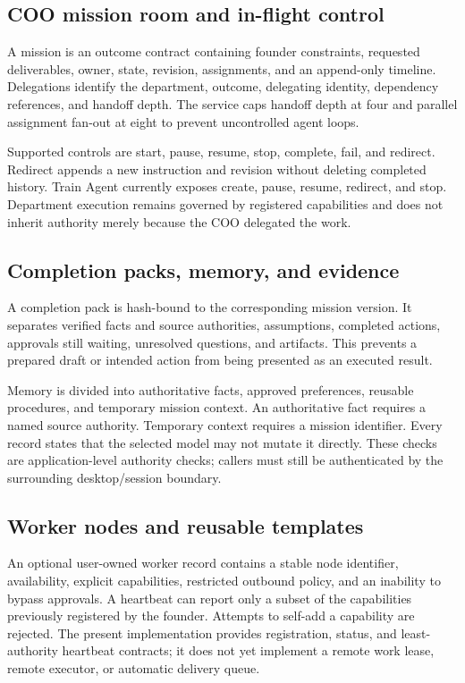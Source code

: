 \subsection{COO mission room and in-flight control}

A mission is an outcome contract containing founder constraints, requested
deliverables, owner, state, revision, assignments, and an append-only timeline.
Delegations identify the department, outcome, delegating identity, dependency
references, and handoff depth.  The service caps handoff depth at four and
parallel assignment fan-out at eight to prevent uncontrolled agent loops.

Supported controls are start, pause, resume, stop, complete, fail, and
redirect.  Redirect appends a new instruction and revision without deleting
completed history.  Train Agent currently exposes create, pause, resume,
redirect, and stop.  Department execution remains governed by registered
capabilities and does not inherit authority merely because the COO delegated
the work.

\subsection{Completion packs, memory, and evidence}

A completion pack is hash-bound to the corresponding mission version.  It
separates verified facts and source authorities, assumptions, completed
actions, approvals still waiting, unresolved questions, and artifacts.  This
prevents a prepared draft or intended action from being presented as an
executed result.

Memory is divided into authoritative facts, approved preferences, reusable
procedures, and temporary mission context.  An authoritative fact requires a
named source authority.  Temporary context requires a mission identifier.
Every record states that the selected model may not mutate it directly.  These
checks are application-level authority checks; callers must still be
authenticated by the surrounding desktop/session boundary.

\subsection{Worker nodes and reusable templates}

An optional user-owned worker record contains a stable node identifier,
availability, explicit capabilities, restricted outbound policy, and an
inability to bypass approvals.  A heartbeat can report only a subset of the
capabilities previously registered by the founder.  Attempts to self-add a
capability are rejected.  The present implementation provides registration,
status, and least-authority heartbeat contracts; it does not yet implement a
remote work lease, remote executor, or automatic delivery queue.

